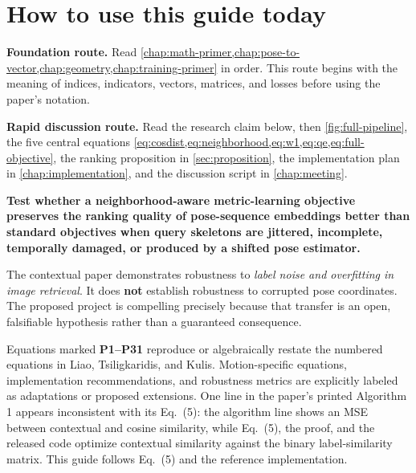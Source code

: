 \documentclass[11pt,oneside,openany]{book}
\theoremstyle{myplain}
\theoremstyle{definition}
\begin{document}
\frontmatter
\chapter*{How to use this guide today}

\begin{meetingbox}[title=Two routes through the book]
\textbf{Foundation route.} Read \cref{chap:math-primer,chap:pose-to-vector,chap:geometry,chap:training-primer} in order. This route begins with the meaning of indices, indicators, vectors, matrices, and losses before using the paper's notation.

\medskip
\textbf{Rapid discussion route.} Read the research claim below, then \cref{fig:full-pipeline}, the five central equations \cref{eq:cosdist,eq:neighborhood,eq:w1,eq:qe,eq:full-objective}, the ranking proposition in \cref{sec:proposition}, the implementation plan in \cref{chap:implementation}, and the discussion script in \cref{chap:meeting}.
\end{meetingbox}

\begin{conceptbox}[title=The one-sentence research claim]
\textbf{Test whether a neighborhood-aware metric-learning objective preserves the ranking quality of pose-sequence embeddings better than standard objectives when query skeletons are jittered, incomplete, temporally damaged, or produced by a shifted pose estimator.}
\end{conceptbox}

\begin{warningbox}[title=The scientific boundary]
The contextual paper demonstrates robustness to \emph{label noise and overfitting in image retrieval}. It does \textbf{not} establish robustness to corrupted pose coordinates. The proposed project is compelling precisely because that transfer is an open, falsifiable hypothesis rather than a guaranteed consequence.
\end{warningbox}

\begin{paperbox}[title=Source-fidelity note]
Equations marked \textbf{P1--P31} reproduce or algebraically restate the numbered equations in Liao, Tsiligkaridis, and Kulis. Motion-specific equations, implementation recommendations, and robustness metrics are explicitly labeled as adaptations or proposed extensions. One line in the paper's printed Algorithm 1 appears inconsistent with its Eq.~(5): the algorithm line shows an MSE between contextual and cosine similarity, while Eq.~(5), the proof, and the released code optimize contextual similarity against the binary label-similarity matrix. This guide follows Eq.~(5) and the reference implementation.
\end{paperbox}
\end{document}

